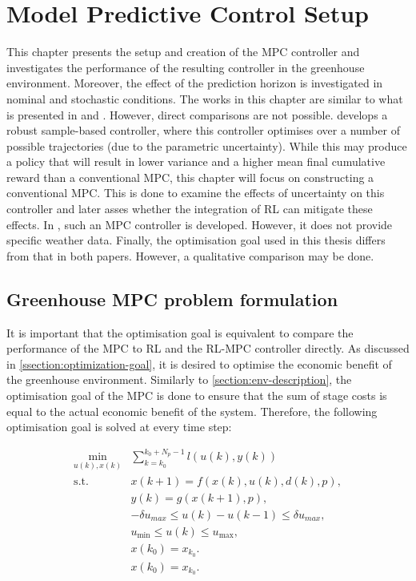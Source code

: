 \chapter{Model Predictive Control Setup}
\label{chapter:MPC}
This chapter presents the setup and creation of the MPC controller and investigates the performance of the resulting controller in the greenhouse environment. Moreover, the effect of the prediction horizon is investigated in nominal and stochastic conditions. The works in this chapter are similar to what is presented in \citet{boersmaRobustSamplebasedModel2022} and \citet{morcegoReinforcementLearningModel2023}. However, direct comparisons are not possible.\citet{boersmaRobustSamplebasedModel2022} develops a robust sample-based controller, where this controller optimises over a number of possible trajectories (due to the parametric uncertainty). While this may produce a policy that will result in lower variance and a higher mean final cumulative reward than a conventional MPC, this chapter will focus on constructing a conventional MPC.  This is done to examine the effects of uncertainty on this controller and later asses whether the integration of RL can mitigate these effects. In \citet{morcegoReinforcementLearningModel2023}, such an MPC controller is developed. However, it does not provide specific weather data. Finally, the optimisation goal used in this thesis differs from that in both papers. However, a qualitative comparison may be done.



\section{Greenhouse MPC problem formulation}\label{section: greenhouse MPC formulation}
It is important that the optimisation goal is equivalent to compare the performance of the MPC to RL and the RL-MPC controller directly. As discussed in \autoref{ssection:optimization-goal}, it is desired to optimise the economic benefit of the greenhouse environment. Similarly to \autoref{section:env-description}, the optimisation goal of the MPC is done to ensure that the sum of stage costs is equal to the actual economic benefit of the system. Therefore, the following optimisation goal is solved at every time step:

\begin{subequations} \label{eq:mpc_ocp}
	\begin{align}
		\min_{u(k),x(k)} & \sum_{k = k_0}^{k_0 + N_p-1} {l(u(k), y(k))} \\
		\text{s.t.} \quad & x(k+1) = f(x(k), u(k), d(k), p),  \label{eq:constraint-1} \\
		& y(k) = g(x(k+1), p), \label{eq:constraint-dynamics} \\
		& -\delta u_{max} \leq u(k) - u(k-1) \leq \delta u_{max}, \label{eq:constraint-delta-u} \\
		& u_{\min} \leq u(k) \leq u_{\max}, \label{eq:constraint-u-limits}\\
		& x(k_0) = x_{k_0}. \label{eq:constraint-initial}\\
		& x(k_0) = x_{k_0}. \label{eq:constraint-initial}
	\end{align}
\end{subequations}

